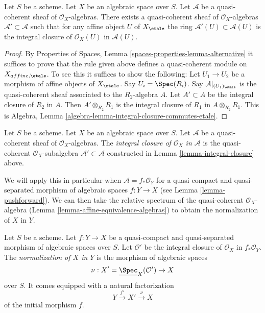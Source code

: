\begin{lemma}
\label{lemma-integral-closure}
Let $S$ be a scheme. Let $X$ be an algebraic space over $S$.
Let $\mathcal{A}$ be a quasi-coherent sheaf of $\mathcal{O}_X$-algebras.
There exists a quasi-coherent sheaf of $\mathcal{O}_X$-algebras
$\mathcal{A}' \subset \mathcal{A}$ such that
for any affine object $U$ of $X_\etale$ the ring
$\mathcal{A}'(U) \subset \mathcal{A}(U)$ is
the integral closure of $\mathcal{O}_X(U)$ in $\mathcal{A}(U)$.
\end{lemma}

\begin{proof}
By Properties of Spaces, Lemma \ref{spaces-properties-lemma-alternative}
it suffices to prove that the rule given above defines a quasi-coherent
module on $X_{affine, \etale}$. To see this it suffices
to show the following: Let $U_1 \to U_2$ be a morphism of affine objects of
$X_\etale$. Say $U_i = \Spec(R_i)$.
Say $\mathcal{A}|_{(U_1)_\etale}$
is the quasi-coherent sheaf associated to
the $R_2$-algebra $A$. Let $A' \subset A$ be the integral closure
of $R_2$ in $A$. Then $A' \otimes_{R_2} R_1$ is the integral closure
of $R_1$ in $A \otimes_{R_2} R_1$. This is
Algebra, Lemma \ref{algebra-lemma-integral-closure-commutes-etale}.
\end{proof}

\begin{definition}
\label{definition-integral-closure}
Let $S$ be a scheme. Let $X$ be an algebraic space over $S$.
Let $\mathcal{A}$ be a quasi-coherent sheaf of $\mathcal{O}_X$-algebras.
The {\it integral closure of $\mathcal{O}_X$ in $\mathcal{A}$} is the
quasi-coherent $\mathcal{O}_X$-subalgebra $\mathcal{A}' \subset \mathcal{A}$
constructed in Lemma \ref{lemma-integral-closure} above.
\end{definition}

\noindent
We will apply this in particular when $\mathcal{A} = f_*\mathcal{O}_Y$
for a quasi-compact and quasi-separated morphism of algebraic spaces
$f : Y \to X$ (see Lemma \ref{lemma-pushforward}). We can then take
the relative spectrum of the quasi-coherent $\mathcal{O}_X$-algebra
(Lemma \ref{lemma-affine-equivalence-algebras}) to obtain the
normalization of $X$ in $Y$.

\begin{definition}
\label{definition-normalization-X-in-Y}
Let $S$ be a scheme. Let $f : Y \to X$ be a quasi-compact and quasi-separated
morphism of algebraic spaces over $S$. Let $\mathcal{O}'$ be the integral
closure of $\mathcal{O}_X$ in $f_*\mathcal{O}_Y$. The {\it normalization of
$X$ in $Y$} is the morphism of algebraic spaces
$$
\nu : X' = \underline{\Spec}_X(\mathcal{O}') \to X
$$
over $S$. It comes equipped with a natural factorization
$$
Y \xrightarrow{f'} X' \xrightarrow{\nu} X
$$
of the initial morphism $f$.
\end{definition}

